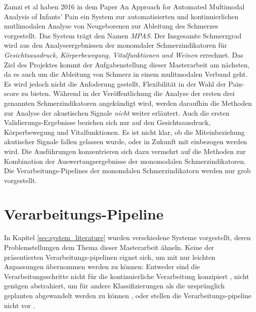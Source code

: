 Zamzi et al  haben 2016 in dem Paper \glqq An Approach for Automated Multimodal Analysis of Infants' Pain\grqq{} \cite{zamziMultimodal} ein System zur automatisierten und kontinuierlichen mutlimodalen Analyse von Neugeborenen zur Ableitung des Schmerzes vorgestellt. Das System trägt den Namen \emph{MPAS}. Der Insgesamte Schmerzgrad wird aus den Analyseergebnissen der monomdaler Schmerzindikatoren für \emph{Gesichtsausdruck, Körperbewegung, Vitalfunktionen und Weinen} errechnet. Das Ziel des Projektes kommt der Aufgabenstellung dieser Masterarbeit am nächsten, da es auch um die Ableitung von Schmerz in einem mulitmodalen Verbund geht. Es wird jedoch nicht die Anfoderung gestellt, Flexibilität in der Wahl der Pain-score zu bieten. Während in der Veröffentlichung die Analyse der ersten drei genannten Schmerzindikatoren angekündigt wird, werden daraufhin die Methoden zur Analyse der akustischen Signale \emph{nicht} weiter erläutert. Auch die ersten Validierungs-Ergebnisse beziehen sich nur auf den Gesichtsausdruck, Körperbewegung und Vitalfunktionen. Es ist nicht klar, ob die Miteinbeziehung akutischer Signale fallen gelassen wurde, oder in Zukunft mit einbezogen werden wird. Die Ausführungen konzentrieren sich dazu vermehrt auf die Methoden zur Kombination der Auswertungsergebnisse der monomodalen Schmerzindikatoren. Die Verarbeitungs-Pipelines der monomdalen Schmerzindikatorn werden nur grob vorgestellt.

\section{Verarbeitungs-Pipeline}

In Kapitel \ref{sec:system_literature} wurden verschiedene Systeme vorgestellt, deren Problemstellungen dem Thema dieser Masterarbeit ähneln. Keine der präsentierten Verarbeitungs-pipelinen eignet sich, um mit nur leichten Anpassungen übernommen werden zu können: Entweder sind die Verarbeitungsschritte nicht für die kontinuierliche Verarbeitung konzipiert \cite{class_abdulaziz} \cite{comparisonOfLearning} \cite{cry_thesis}, nicht genügen abstrahiert, um für andere Klassifizierungen als die ursprünglich geplanten abgewandelt werden zu können \cite{cohenCry}, oder stellen die Verarbeitungs-pipeline nicht vor \cite{palEmotion} \cite{zamziMultimodal}.



